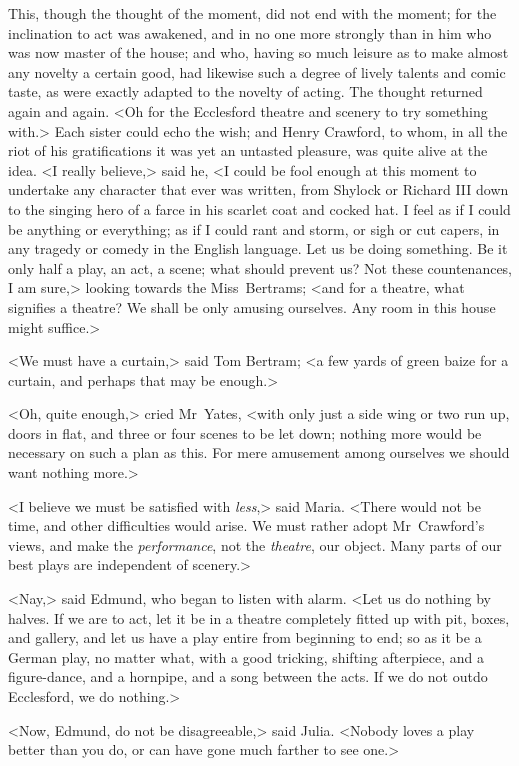This, though the thought of the moment, did not end with the moment; for the inclination to act was awakened, and in no one more strongly than in him who was now master of the house; and who, having so much leisure as to make almost any novelty a certain good, had likewise such a degree of lively talents and comic taste, as were exactly adapted to the novelty of acting. The thought returned again and again. <Oh for the Ecclesford theatre and scenery to try something with.> Each sister could echo the wish; and Henry Crawford, to whom, in all the riot of his gratifications it was yet an untasted pleasure, was quite alive at the idea. <I really believe,> said he, <I could be fool enough at this moment to undertake any character that ever was written, from Shylock or Richard III down to the singing hero of a farce in his scarlet coat and cocked hat. I feel as if I could be anything or everything; as if I could rant and storm, or sigh or cut capers, in any tragedy or comedy in the English language. Let us be doing something. Be it only half a play, an act, a scene; what should prevent us? Not these countenances, I am sure,> looking towards the Miss~Bertrams; <and for a theatre, what signifies a theatre? We shall be only amusing ourselves. Any room in this house might suffice.>

<We must have a curtain,> said Tom Bertram; <a few yards of green baize for a curtain, and perhaps that may be enough.>

<Oh, quite enough,> cried Mr~Yates, <with only just a side wing or two run up, doors in flat, and three or four scenes to be let down; nothing more would be necessary on such a plan as this. For mere amusement among ourselves we should want nothing more.>

<I believe we must be satisfied with \textit{less},> said Maria. <There would not be time, and other difficulties would arise. We must rather adopt Mr~Crawford's views, and make the \textit{performance}, not the \textit{theatre}, our object. Many parts of our best plays are independent of scenery.>

<Nay,> said Edmund, who began to listen with alarm. <Let us do nothing by halves. If we are to act, let it be in a theatre completely fitted up with pit, boxes, and gallery, and let us have a play entire from beginning to end; so as it be a German play, no matter what, with a good tricking, shifting afterpiece, and a figure-dance, and a hornpipe, and a song between the acts. If we do not outdo Ecclesford, we do nothing.>

<Now, Edmund, do not be disagreeable,> said Julia. <Nobody loves a play better than you do, or can have gone much farther to see one.>

